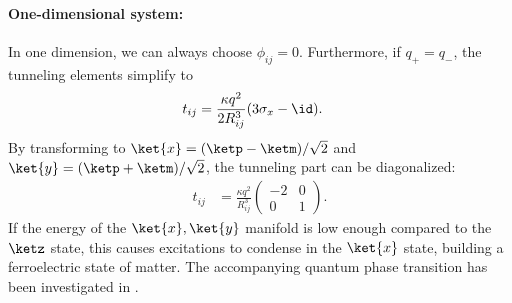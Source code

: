 \paragraph{One-dimensional system:}
In one dimension, we can always choose $\phi_{ij}=0$. Furthermore, if $q_+=q_-$, the tunneling
elements simplify to
\begin{align}
    t_{ij} &= \frac{\kappa q^2}{2R_{ij}^3} (3\sigma_x-\id).
\end{align}
By transforming to $\ket{x}=(\ketp-\ketm)/\sqrt{2}$ and $\ket{y}=(\ketp+\ketm)/\sqrt{2}$, the
tunneling part can be diagonalized:
\begin{align}
    t_{ij} &= \frac{\kappa q^2}{R_{ij}^3} \begin{pmatrix}
    -2 & 0 \\
    0 & 1
    \end{pmatrix}.
\end{align}
If the energy of the $\ket{x}, \ket{y}$ manifold is low enough compared to the $\ketz$ state, this
causes excitations to condense in the $\ket{x}$ state, building a ferroelectric state of matter. The accompanying quantum phase transition has been investigated in .

